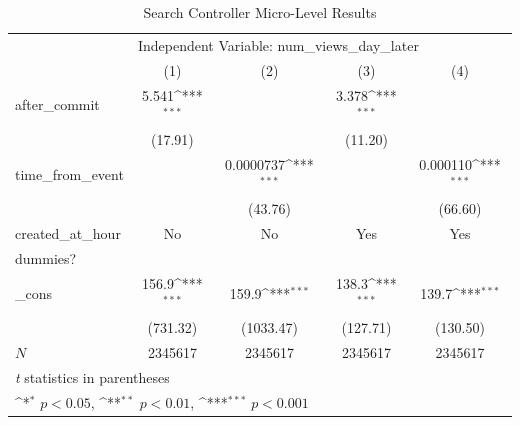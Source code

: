 \documentclass[10pt]{report}
\begin{document}
\begin{table}[h!]
\caption{Search Controller Micro-Level Results}
\centering
{
    \def\sym#1{\ifmmode^{#1}\else\(^{#1}\)\fi}
    \begin{tabular}{l*{4}{c}}
    \hline\hline
        & \multicolumn{4}{l}{Independent Variable: num\_views\_day\_later} \\ 
        &\multicolumn{1}{c}{(1)}&\multicolumn{1}{c}{(2)}&\multicolumn{1}{c}{(3)}&\multicolumn{1}{c}{(4)}\\
        \hline
        after\_commit&       5.541\sym{***}&               &       3.378\sym{***}&                     \\
        &     (17.91)         &                     &     (11.20)         &                     \\
        [1em]
        time\_from\_event&                     &   0.0000737\sym{***}&                     &    0.000110\sym{***}\\
        &                    &     (43.76)         &                     &     (66.60)         \\
        [1em]
        created\_at\_hour&             No        &           No           &       Yes &      Yes \\
        dummies?&                     &                     &              &            \\
        [1em]
        \_cons      &       156.9\sym{***}&       159.9\sym{***}&       138.3\sym{***}&       139.7\sym{***}\\
        &    (731.32)     &   (1033.47)         &    (127.71)         &    (130.50)         \\
        \hline
        \(N\)       &     2345617       &     2345617         &     2345617         &     2345617         \\
        \hline\hline
        \multicolumn{5}{l}{\footnotesize \textit{t} statistics in parentheses}\\
        \multicolumn{5}{l}{\footnotesize \sym{*} \(p<0.05\), \sym{**} \(p<0.01\), \sym{***} \(p<0.001\)}\\
        \end{tabular}
}
\label{table:search-micro-commit-results}
\end{table}
\end{document}
